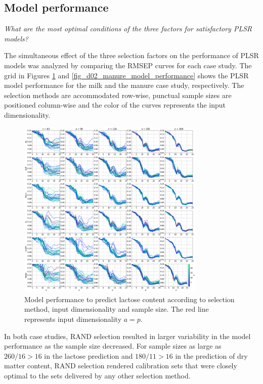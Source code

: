 \documentclass[preprint,12pt]{elsarticle}
\begin{document}
\subsection{Model performance}\label{results:modperformance}


\emph{What are the most optimal conditions of the three factors for satisfactory PLSR models?}

The simultaneous effect of the three selection factors on the performance of PLSR models was analyzed by comparing the RMSEP curves for each case study. The grid in Figures \ref{fig_d01_milk_model_performance} and \ref{fig_d02_manure_model_performance} shows the PLSR model performance for the milk and the manure case study, respectively. The selection methods are accommodated row-wise, punctual sample sizes are positioned column-wise and the color of the curves represents the input dimensionality. 


\begin{figure}[H]
\includegraphics[width=0.8\textwidth]{manuscript/figures/d01_milk_model_performance.png}
\centering
\caption{Model performance to predict lactose content according to selection method, input dimensionality and sample size. The red line represents input dimensionality $a=p$.}
\label{fig_d01_milk_model_performance}
\end{figure}

In both case studies, RAND selection resulted in larger variability in the model performance as the sample size decreased. For sample sizes as large as $260/16 > 16$ in the lactose prediction and $180/11 > 16$ in the prediction of dry matter content, RAND selection rendered calibration sets that were closely optimal to the sets delivered by any other selection method. 
\end{document}
